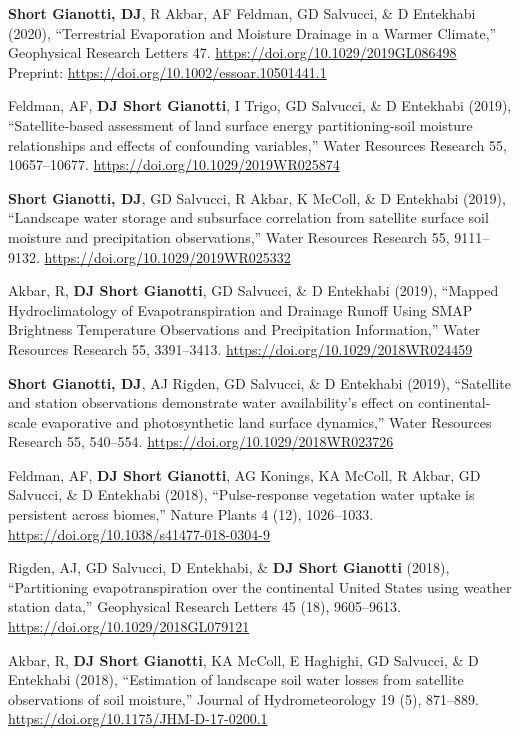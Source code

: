 \documentclass[10pt, a4paper]{article}
\newcommand{\lbr}{\vspace*{12pt}}
\newcommand{\years}[1]{\mbox{}\marginnote{\scriptsize #1}} %
\begin{document}
\years{2020a}\textbf{Short Gianotti, DJ}, R Akbar, AF Feldman, GD Salvucci, \& D Entekhabi (2020), ``Terrestrial Evaporation and Moisture Drainage in a Warmer Climate,'' Geophysical Research Letters 47. \url{https://doi.org/10.1029/2019GL086498}\\ Preprint: \url{https://doi.org/10.1002/essoar.10501441.1}\lbr

\years{2019d}Feldman, AF, \textbf{DJ Short Gianotti}, I Trigo, GD Salvucci, \& D Entekhabi (2019), ``Satellite-based assessment of land surface energy partitioning-soil moisture relationships and effects of confounding variables,'' Water Resources Research 55, 10657--10677. \url{https://doi.org/10.1029/2019WR025874} \lbr

\years{2019c}\textbf{Short Gianotti, DJ}, GD Salvucci, R Akbar, K McColl, \& D Entekhabi (2019), ``Landscape water storage and subsurface correlation from satellite surface soil moisture and precipitation observations,'' Water Resources Research 55, 9111--9132. \url{https://doi.org/10.1029/2019WR025332} \lbr

\years{2019b}Akbar, R, \textbf{DJ Short Gianotti}, GD Salvucci, \& D Entekhabi (2019), ``Mapped Hydroclimatology of Evapotranspiration and Drainage Runoff Using SMAP Brightness Temperature Observations and Precipitation Information,'' Water Resources Research 55, 3391--3413. \url{https://doi.org/10.1029/2018WR024459}\lbr  

\years{2019a}\textbf{Short Gianotti, DJ}, AJ Rigden, GD Salvucci, \& D Entekhabi (2019), ``Satellite and station observations demonstrate water availability's effect on continental-scale evaporative and photosynthetic land surface dynamics,'' Water Resources Research 55, 540--554. \url{https://doi.org/10.1029/2018WR023726} \lbr

\years{2018e}Feldman, AF, \textbf{DJ Short Gianotti}, AG Konings, KA McColl, R Akbar, GD Salvucci, \& D Entekhabi (2018), ``Pulse-response vegetation water uptake is persistent across biomes,'' Nature Plants 4 (12), 1026--1033. \url{https://doi.org/10.1038/s41477-018-0304-9} \lbr

\years{2018d}Rigden, AJ, GD Salvucci, D Entekhabi, \& \textbf{DJ Short Gianotti} (2018), ``Partitioning evapotranspiration over the continental United States using weather station data,'' Geophysical Research Letters 45 (18), 9605--9613. \url{https://doi.org/10.1029/2018GL079121} \lbr

\years{2018c}Akbar, R, \textbf{DJ Short Gianotti}, KA McColl, E Haghighi, GD Salvucci, \& D Entekhabi (2018), ``Estimation of landscape soil water losses from satellite observations of soil moisture,'' Journal of Hydrometeorology 19 (5), 871--889. \url{https://doi.org/10.1175/JHM-D-17-0200.1} \lbr
\end{document}
